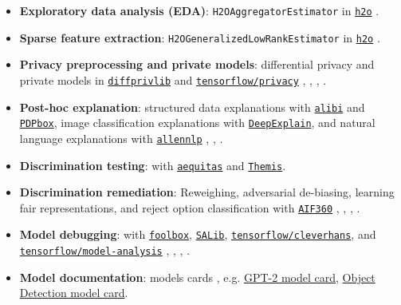 \documentclass[information,article,submit,moreauthors,pdftex]{definitions/mdpi}
\begin{document}
\begin{itemize}[leftmargin=*,labelsep=5.8mm]

\item \textbf{Exploratory data analysis (EDA)}: \texttt{H2OAggregatorEstimator} in \href{http://docs.h2o.ai/h2o/latest-stable/h2o-py/docs/modeling.html#h2oaggregatorestimator}{\texttt{h2o}} \cite{wilkinson2018visualizing}.

\item \textbf{Sparse feature extraction}: \texttt{H2OGeneralizedLowRankEstimator} in \href{http://docs.h2o.ai/h2o/latest-stable/h2o-py/docs/modeling.html#h2ogeneralizedlowrankestimator}{\texttt{h2o}} \cite{udell2016generalized}.

\item \textbf{Privacy preprocessing and private models}: differential privacy and private models in \href{https://github.com/IBM/differential-privacy-library}{\texttt{diffprivlib}} and \href{https://github.com/tensorflow/privacy/}{\texttt{tensorflow/privacy}} \cite{diffprivlib}, \cite{ji2014differential}, \cite{pate}, \cite{abadi2016deep}.

\item \textbf{Post-hoc explanation}: structured data explanations with \href{https://github.com/SeldonIO/alibi}{\texttt{alibi}} and \href{https://github.com/SauceCat/PDPbox}{\texttt{PDPbox}}, image classification explanations with \href{https://github.com/marcoancona/DeepExplain}{\texttt{DeepExplain}}, and natural language explanations with \href{https://github.com/allenai/allennlp}{\texttt{allennlp}} \cite{wachter2017counterfactual}, \cite{grad_attr}, \cite{wallace2019allennlp}. 

\item \textbf{Discrimination testing}: with \href{https://github.com/dssg/aequitas}{\texttt{aequitas}} and \href{https://github.com/LASER-UMASS/Themis}{\texttt{Themis}}.

\item \textbf{Discrimination remediation}: Reweighing, adversarial de-biasing, learning fair representations, and reject option classification with \href{http://aif360.mybluemix.net/}{\texttt{AIF360}} \cite{kamiran2012data}, \cite{zhang2018mitigating}, \cite{lfr}, \cite{kamiran2012decision}.

\item \textbf{Model debugging}: with \href{https://github.com/bethgelab/foolbox}{\texttt{foolbox}}, \href{https://github.com/SALib/SALib}{\texttt{SALib}}, \href{https://github.com/tensorflow/cleverhans}{\texttt{tensorflow/cleverhans}}, and \href{https://github.com/tensorflow/model-analysis}{\texttt{tensorflow/model-analysis}} \cite{rauber2017foolbox}, \cite{papernot2018cleverhans}, \cite{modeltracker}, \cite{papernot2018marauder}.

\item \textbf{Model documentation}: models cards \cite{model_cards}, e.g.  \href{https://github.com/openai/gpt-2/blob/master/model_card.md}{GPT-2 model card}, \href{https://modelcards.withgoogle.com/object-detection}{Object Detection model card}. 

\end{itemize}
\end{document}
